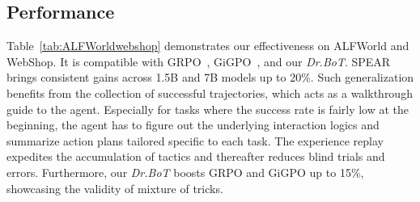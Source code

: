\documentclass[]{youtu} %
\newcommand{\method}{\textsc{SPEAR}\xspace}
\begin{document}
\subsection{Performance}
\label{sec:performance}



Table~\ref{tab:ALFWorldwebshop} demonstrates our effectiveness on ALFWorld and WebShop.
It is compatible with GRPO~\cite{shao2024deepseekmath},
GiGPO~\cite{feng2025group},
and our \textit{Dr.BoT}.
\method brings consistent gains across 1.5B and 7B models up to 20\%.
Such generalization benefits from the collection of successful trajectories,
which acts as a walkthrough guide to the agent.
Especially for tasks where the success rate is fairly low at the beginning,
the agent has to figure out the underlying interaction logics and summarize action plans tailored specific to each task.
The experience replay expedites the accumulation of tactics and thereafter reduces blind trials and errors.
Furthermore,
our \textit{Dr.BoT} boosts GRPO and GiGPO up to 15\%,
showcasing the validity of mixture of tricks.
\end{document}
